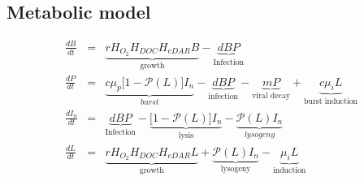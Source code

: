 \documentclass[10pt,a4paper,twoside,onecolumn, english]{report}
\begin{document}
\subsection{Metabolic model}
\begin{eqnarray*}
   \frac{dB}{dt}&=&\underbrace{r H_{O_2}H_{DOC}H_{eDAR}B}_{\text{growth}} - \underbrace{dBP}_{\text{Infection}} \\
   \frac{dP}{dt}&=&\underbrace{c\mu_p \big[1 - \mathcal{P}(L)\big]I_n}_{burst} - \underbrace{dBP}_{\text{infection}} - \underbrace{mP}_{\text{viral decay}} + \underbrace{c\mu_i L}_{\text{burst induction}} \\
   \frac{dI_n}{dt}&=&\underbrace{dBP}_{\text{Infection}} - \underbrace{\big[1 - \mathcal{P}(L) \big] I_n}_{\text{lysis}} - \underbrace{\mathcal{P}(L) I_n}_{lysogeny} \\
   \frac{dL}{dt}&=&\underbrace{rH_{O_2}H_{DOC}H_{eDAR}L}_{\text{growth}} + \underbrace{\mathcal{P}(L)I_n }_{\text{lysogeny}} - \underbrace{\mu_i L}_{\text{induction}} \\
\end{eqnarray*}
\end{document}
